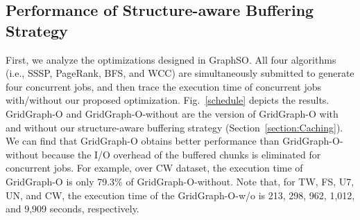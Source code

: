 \documentclass[10pt,journal,compsoc]{IEEEtran}
\begin{document}
\subsection{Performance of Structure-aware Buffering Strategy}\label{section:4.3}
\vspace{-2pt}
First, we analyze the optimizations designed in GraphSO. All four algorithms (i.e., SSSP, PageRank, BFS, and WCC) are simultaneously submitted to generate four concurrent jobs, and then trace the execution time of concurrent jobs with/without our proposed optimization. Fig.~\ref{schedule} depicts the results.
GridGraph-O and GridGraph-O-without are the version of GridGraph-O with and without our structure-aware buffering strategy (Section~\ref{section:Caching}).
We can find that
GridGraph-O obtains better performance than GridGraph-O-without because the I/O overhead of the buffered chunks is eliminated for concurrent jobs.
For example, over CW dataset, the execution time of GridGraph-O is only 79.3\% of GridGraph-O-without.
Note that, for TW, FS, U7, UN, and CW, the execution time of the  GridGraph-O-w/o is 213, 298, 962, 1,012, and 9,909 seconds, respectively.

\end{document}
